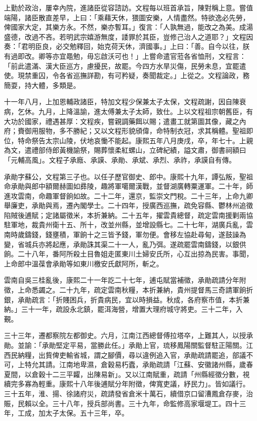 \begin{pinyinscope}
上勤於政治，屢幸內院，進諸臣從容諮訪。文程每以班首承旨，陳對稱上意。嘗值端陽，諸臣散直差早，上曰：「乘藉天休，猥圖安樂，人情盡然。特欲逸必先勞，俾國家大定，其樂方永。不然，樂亦暫耳。」復言：「人孰無過，能改之為美。成湯盛德，改過不吝。若明武宗嬉游無度，諉罪於其臣，豈修己治人之道耶？」文程因奏：「君明臣良，必交勉釋回，始克荷天休，濟國事。」上曰：「善。自今以往，朕有過即改。卿等亦宜黽勉，毋忘啟沃可也！」上嘗命遣官蒞各省恤刑，文程言：「前此遣滿、漢大臣巡方，慮擾民，故罷。今四方水旱災傷，民勞未息，宜罷遣使。現禁重囚，令各省巡撫詳勘，有可矜疑，奏聞裁定。」上從之。文程論政，務簡耍，持大體，多類是。

十一年八月，上加恩輔政諸臣，特加文程少保兼太子太保，文程疏謝，因自陳衰病，乞休。九月，上降溫諭，進太傅兼太子太師，致仕。上以文程祖宗朝舊臣，有大功於國家，禮遇甚厚：文程疾，嘗親調藥餌以賜；遣畫工就第圖其像，藏之內府；賚御用服物，多不勝紀；又以文程形貌頎偉，命特制衣冠，求其稱體。聖祖即位，特命祭告太宗山陵，伏地哀慟不能起。康熙五年八月庚戌，卒，年七十。上親為文，遣禮部侍郎黃機諭祭，賜葬懷柔紅螺山，立碑紀績，謚文肅，御書祠額曰「元輔高風」。文程子承廕、承謨、承勛、承斌、承烈、承祚，承謨自有傳。

承勛字蘇公，文程第三子也。以任子歷官御史、郎中。康熙十九年，譚弘叛，聖祖命承勛與郎中額爾赫圖如彞陵，趣將軍噶爾漢戰，並督湖廣轉粟運軍。二十年，師進攻雲南，命趣軍督餉如故。二十二年，還京，監崇文門稅。二十三年，上命九卿舉廉吏，承勛與焉，遷內閣學士。二十四年，授廣西巡撫，疏免容縣、鬱林州追徵陷賊後逋賦；定諸屬徵米，本折兼納。二十五年，擢雲貴總督，疏定雲南援剿兩協駐軍地，裁貴州衛十五、所十，改並州縣，並增設縣七。二十七年，湖廣兵亂，雲南時歲鑄錢，錢壅積，軍餉十之三皆予錢，軍勿便。會移左協赴尋甸，遂鼓譟為變，省城兵亦將起應，承勛誅其渠二十一人，亂乃弭。遂疏罷雲南鑄錢，以銀供餉。二十八年，番阿所殺土目魯姐走匿東川土婦安氏所，心互出掠為民害。事聞，上命郎中溫葆會承勛等如東川檄安氏獻阿所，斬之。

雲南自吳三桂亂後，康熙二十一年訖二十七年，逋屯賦當補徵，承勛疏請分年附徵，上命悉蠲之。二十九年，疏定雲南秋糧，本折兼納，貴州提督馬三奇請軍餉折銀，承勛疏言：「折賤困兵，折貴病民，宜以時損益。秋成，各府察巿值，本折兼納。」三十一年，疏設永北鎮，罷洱海營，增置大理府城守將吏。三十二年，入覲。

三十三年，遷都察院左都御史。六月，江南江西總督傅拉塔卒，上難其人，以授承勛。並諭：「承勛堅定平易，當勝此任。」承勛上官，琉移鳳陽關監督駐正陽關。江西民納糧，出貲俾吏輸省城，謂之腳價，尋以違例追入官，承勛疏請罷追，部議不可，上特允其請。江南地卑濕，倉穀易朽蠹，承勛疏請「江蘇、安徽諸州縣，歲春夏間，以倉穀十二三平糶，出陳易新」。又以江南賦重，疏請「州縣經徵分數，視續完多寡為輕重。康熙十八年後逋賦分年附徵，俾寬吏議，紓民力」。皆如議行。三十五年，淮、揚、徐諸府災，疏請發省倉米十萬石，續借京口留漕鳳倉存麥，治賑，民賴以全。三十八年，授兵部尚書。三十九年，命監修高家堰堤工。四十三年，工成，加太子太保。五十三年，卒。


\end{pinyinscope}
